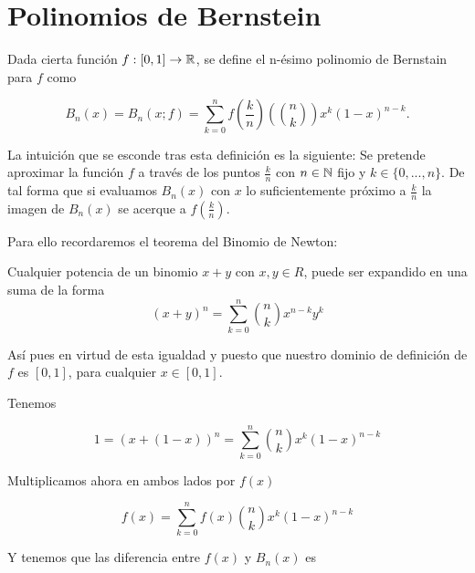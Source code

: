 %

\chapter{Polinomios de Bernstein}\label{ch:Bernstein}

\begin{definicion} \label{def:Bernstein}
    Dada cierta función $f: [0,1] \rightarrow \mathbb{R}$, se define el n-ésimo polinomio de Bernstain para $f$ como 

    $$B_n(x) = B_n(x;f)=\sum_ {k=0}^{n} f \left( \frac{k}{n} \right) \left( \binom{n}{k} \right) x^k (1-x)^{n-k}.$$

\end{definicion}

La intuición que se esconde tras esta definición es la siguiente: 
Se pretende aproximar la función $f$ a través de los puntos $\frac{k}{n}$ con $n \in \mathbb{N}$ fijo
y $k \in \{0,...,n \}.$
De tal forma que si evaluamos $B_n(x)$ con $x$ lo suficientemente próximo a  $\frac{k}{n}$  
la imagen de $B_n(x)$ se acerque a $f \left( \frac{k}{n} \right).$

Para ello recordaremos el teorema del Binomio de Newton: 

\begin{teorema}
    Cualquier potencia de un binomio $x+y$ con $x,y \in R$,  puede ser expandido en una suma de la forma
    \[(x+y)^n = \sum_{k=0}^n \binom{n}{k} x^{n-k}y^k\]
\end{teorema}

Así pues en virtud de esta igualdad y puesto que nuestro dominio de definición de $f$ es $[0,1]$, para cualquier $x \in [0,1].$

Tenemos 

\begin{equation}\label{eq:uno_igual_binomio}
    1 = (x+ (1-x))^n = \sum_{k=0}^n \binom{n}{k} x^{k} (1-x)^{n-k}
\end{equation}

Multiplicamos ahora en ambos lados por $f(x)$

\begin{equation}
    f(x) = \sum_{k=0}^n f(x) \binom{n}{k} x^{k} (1-x)^{n-k}
\end{equation} 

Y tenemos que las diferencia entre $f(x)$ y $B_n(x)$ es

